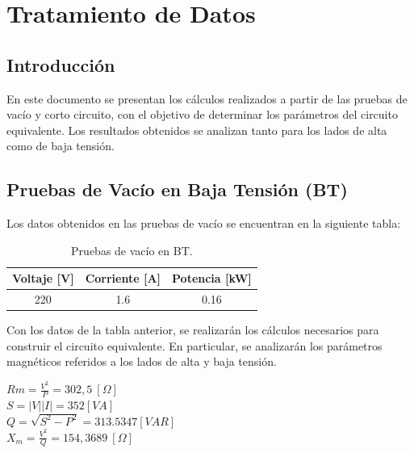 

\section{Tratamiento de Datos}
\subsection{Introducción}

En este documento se presentan los cálculos realizados a partir de las pruebas de vacío y corto circuito, con el objetivo de determinar los parámetros del circuito equivalente. Los resultados obtenidos se analizan tanto para los lados de alta como de baja tensión.

\subsection{Pruebas de Vacío en Baja Tensión (BT)}

Los datos obtenidos en las pruebas de vacío se encuentran en la siguiente tabla:

\begin{table}[h!]
\centering
\begin{tabular}{|c|c|c|}
\hline
\textbf{Voltaje [V]} & \textbf{Corriente [A]} & \textbf{Potencia [kW]} \\ \hline
220                 & 1.6                    & 0.16                   \\ \hline
\end{tabular}
\caption{Pruebas de vacío en BT.}
\end{table}

Con los datos de la tabla anterior, se realizarán los cálculos necesarios para construir el circuito equivalente. En particular, se analizarán los parámetros magnéticos referidos a los lados de alta y baja tensión.

    

\begin{center}
    $Rm = \frac{V^2}{P} = 302,5~[\Omega]$ \\
    \vspace{0.2cm}
    $S = |V||I| = 352[VA]$\\
    \vspace{0.2cm}
    $Q = \sqrt{S^2 - P^2} = 313.5347[VAR]$ \\
    \vspace{0.2cm}
    $X_m = \frac{V^2}{Q} = 154,3689~[\Omega]$ \\

\end{center}


